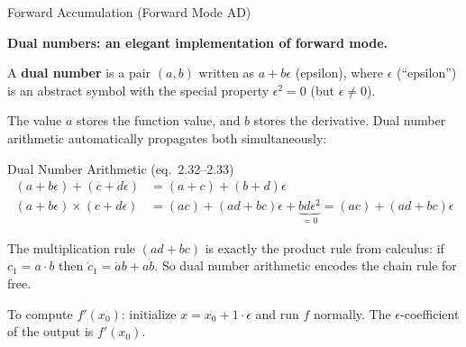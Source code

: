 \documentclass[aspectratio=169,10pt]{beamer}
\begin{document}
\begin{frame}[allowframebreaks]{Forward Accumulation (Forward Mode AD)}
  \framebreak

  \textbf{Dual numbers: an elegant implementation of forward mode.}

  A \textbf{dual number} is a pair $(a, b)$ written as $a + b\epsilon$
  (epsilon), where $\epsilon$ (``epsilon'') is an abstract symbol with
  the special property $\epsilon^2 = 0$ (but $\epsilon \neq 0$).

  The value $a$ stores the function value, and $b$ stores the derivative.
  Dual number arithmetic automatically propagates both simultaneously:

  \begin{block}{Dual Number Arithmetic (eq.\ 2.32--2.33)}
    \begin{align*}
      (a+b\epsilon) + (c+d\epsilon) &= (a+c) + (b+d)\epsilon \\
      (a+b\epsilon) \times (c+d\epsilon)
        &= (ac) + (ad+bc)\epsilon + \underbrace{bd\epsilon^2}_{=0}
         = (ac) + (ad+bc)\epsilon
    \end{align*}
  \end{block}

  The multiplication rule $(ad+bc)$ is exactly the product rule from
  calculus: if $c_1 = a \cdot b$ then $\dot{c}_1 = \dot{a}b + a\dot{b}$.
  So dual number arithmetic encodes the chain rule for free.

  \medskip
  To compute $f'(x_0)$: initialize $x = x_0 + 1\cdot\epsilon$ and run
  $f$ normally.  The $\epsilon$-coefficient of the output is $f'(x_0)$.

\end{frame}
\end{document}
